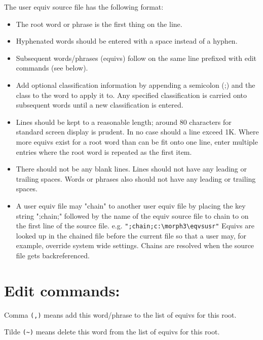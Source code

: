 The user equiv source file has the following format:
\begin{itemize}
\item The root word or phrase is the first thing on the line.

\item Hyphenated words should be entered with a space instead of a
hyphen.

\item Subsequent words/phrases (equivs) follow on the same line
prefixed with edit commands (see below).

\item Add optional classification information by appending a semicolon
(;) and the class to the word to apply it to.  Any specified
classification is carried onto subsequent words until a new
classification is entered.

\item Lines should be kept to a reasonable length; around 80
characters for standard screen display is prudent.  In no case
should a line exceed 1K.  Where more equivs exist for a root
word than can be fit onto one line, enter multiple entries where
the root word is repeated as the first item.

\item There should not be any blank lines.  Lines should not have any
leading or trailing spaces.  Words or phrases also should not
have any leading or trailing spaces.

\item A user equiv file may "chain" to another user equiv file by
placing the key string ";chain;" followed by the name of the
equiv source file to chain to on the first line of the source
file. e.g.  \verb`";chain;c:\morph3\eqvsusr"` Equivs are looked up
in the chained file before the current file so that a user may,
for example, override system wide settings.  Chains are resolved
when the source file gets backreferenced.
\end{itemize}

\section{Edit commands:}

Comma \verb`(,)` means add this word/phrase to the list of equivs for
this root.

Tilde \verb`(~)` means delete this word from the list of equivs for this
root.


